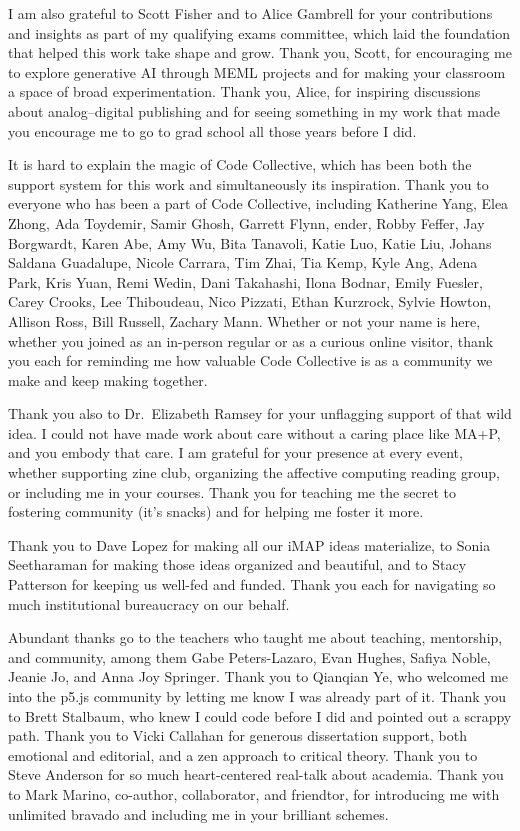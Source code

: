 I am also grateful to Scott Fisher and to Alice Gambrell for your
contributions and insights as part of my qualifying exams committee,
which laid the foundation that helped this work take shape and grow.
Thank you, Scott, for encouraging me to explore generative AI through
MEML projects and for making your classroom a space of broad
experimentation. Thank you, Alice, for inspiring discussions about
analog--digital publishing and for seeing something in my work that made
you encourage me to go to grad school all those years before I did.

It is hard to explain the magic of Code Collective, which has been both
the support system for this work and simultaneously its inspiration.
Thank you to everyone who has been a part of Code Collective, including
Katherine Yang, Elea Zhong, Ada Toydemir, Samir Ghosh, Garrett Flynn,
ender, Robby Feffer, Jay Borgwardt, Karen Abe, Amy Wu, Bita Tanavoli,
Katie Luo, Katie Liu, Johans Saldana Guadalupe, Nicole Carrara, Tim
Zhai, Tia Kemp, Kyle Ang, Adena Park, Kris Yuan, Remi Wedin, Dani
Takahashi, Ilona Bodnar, Emily Fuesler, Carey Crooks, Lee Thiboudeau,
Nico Pizzati, Ethan Kurzrock, Sylvie Howton, Allison Ross, Bill Russell,
Zachary Mann. Whether or not your name is here, whether you joined as an
in-person regular or as a curious online visitor, thank you each for
reminding me how valuable Code Collective is as a community we make and
keep making together.

Thank you also to Dr.~Elizabeth Ramsey for your unflagging support of
that wild idea. I could not have made work about care without a caring
place like MA+P, and you embody that care. I am grateful for your
presence at every event, whether supporting zine club, organizing the
affective computing reading group, or including me in your courses.
Thank you for teaching me the secret to fostering community (it's
snacks) and for helping me foster it more.

Thank you to Dave Lopez for making all our iMAP ideas materialize, to
Sonia Seetharaman for making those ideas organized and beautiful, and to
Stacy Patterson for keeping us well-fed and funded. Thank you each for
navigating so much institutional bureaucracy on our behalf.

Abundant thanks go to the teachers who taught me about teaching,
mentorship, and community, among them Gabe Peters-Lazaro, Evan Hughes,
Safiya Noble, Jeanie Jo, and Anna Joy Springer. Thank you to Qianqian
Ye, who welcomed me into the p5.js community by letting me know I was
already part of it. Thank you to Brett Stalbaum, who knew I could code
before I did and pointed out a scrappy path. Thank you to Vicki Callahan
for generous dissertation support, both emotional and editorial, and a
zen approach to critical theory. Thank you to Steve Anderson for so much
heart-centered real-talk about academia. Thank you to Mark Marino,
co-author, collaborator, and friendtor, for introducing me with
unlimited bravado and including me in your brilliant schemes.

